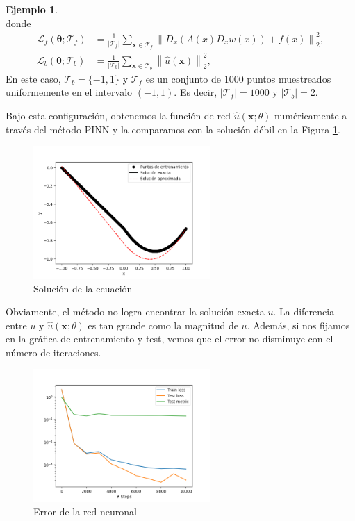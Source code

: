\documentclass[a4paper,11pt,spanish, twoside, leqno]{tfg-uam}
\theoremstyle{definition}
\newtheorem{exmp}[teor]{Ejemplo}
\begin{document}
\begin{mdframed}
\begin{exmp}
\begin{equation*}
        \end{equation*}
        donde
        \begin{align*}
            \mathcal{L}_f(\boldsymbol{\theta}; \mathcal{T}_f) &= \frac{1}{|\mathcal{T}_f|} \sum_{\mathbf{x} \in \mathcal{T}_f} \left\| D_{x}(A(x)D_{x} w(x))+f(x)\right\|_2^2, \\ 
            \mathcal{L}_b(\boldsymbol{\theta}; \mathcal{T}_b) &= \frac{1}{|\mathcal{T}_b|} \sum_{\mathbf{x} \in \mathcal{T}_b} \left\| \hat{u} (\mathbf{x})\right\|_2^2,
        \end{align*}
        En este caso, $\mathcal{T}_b=\{-1,1\}$ y $\mathcal{T}_f$ es un conjunto de 1000 puntos muestreados uniformemente en el intervalo $(-1,1)$. Es decir, $|\mathcal{T}_f|=1000$ y $|\mathcal{T}_b|=2$.

        Bajo esta configuración, obtenemos la función de red $\hat{u}(\mathbf{x};\theta)$ numéricamente a través del método PINN y la comparamos con la solución débil en la Figura \ref{fig:deviation}. 

        \begin{figure}[H] 
            \centering
            \includegraphics[width=0.6\textwidth]{Figuras/fallo_edp_pinn.png}
            \caption{Solución de la ecuación}
            \label{fig:deviation}
        \end{figure}


        Obviamente, el método no logra encontrar la solución exacta $u$. La diferencia entre $u$ y $\hat{u}(\mathbf{x};\theta)$ es tan grande como la magnitud de $u$. Además, si nos fijamos en la gráfica de entrenamiento y test, vemos que el error no disminuye con el número de iteraciones.
        \begin{figure}[H]
            \centering
            \includegraphics[width=0.6\textwidth]{Figuras/test_train_pinn_error.png}
            \caption{Error de la red neuronal}
        \end{figure}


\end{exmp}
\end{mdframed}
\end{document}
